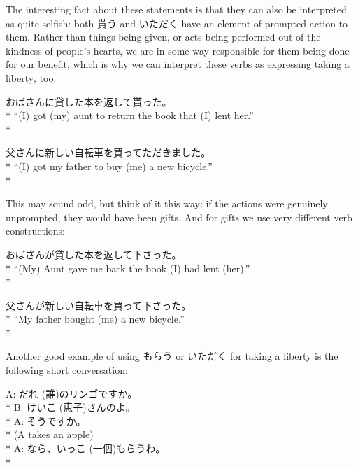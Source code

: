 \documentclass[11pt, b5paper, twoside, openright, onecolumn]{book}
\makeatletter
\newcommand*{\rubystack}[2]{{\relscale{0.5}%
  \begin{tabular}[b]{@{}c@{}}%
    {#1}\\%
   {\textscale{2}{#2}}%
  \end{tabular}}%
}
\DeclareRobustCommand*{\ruby}[2]{%
  \mbox{%
    \setlength{\parskip}{0ex}%
    \BeginAccSupp{method=pdfstringdef,ActualText={#1}}%
      \rubystack{\phantom{#2}}{#1}%
      \llap{%
        \rubystack{#2}{\phantom{#1}}%
      }%
    \EndAccSupp{}%
  }%
}
\renewcommand*{\ruby}[2]{#2 (#1)}%
\newenvironment{exampleblock}{
\setlength{\parindent}{0.6in}
\begin{minipage}[t]{\dimexpr\textwidth-\parindent}}
{\end{minipage}}
\makeatother
\begin{document}
The interesting fact about these statements is that they can also be interpreted as quite selfish: both 貰う and いただく have an element of prompted action to them. Rather than things being given‚ or acts being performed out of the kindness of people’s hearts‚ we are in some way responsible for them being done for our benefit‚ which is why we can interpret these verbs as expressing taking a liberty‚ too:

\vspace{0.4cm}
\begin{exampleblock}
おばさんに貸した本を返して貰った。 \\* 
“(I) got (my) aunt to return the book that (I) lent her.” \\* 
\end{exampleblock}
\vspace{0.2cm}

\begin{exampleblock}
父さんに新しい自転車を買ってただきました。 \\* 
“(I) got my father to buy (me) a new bicycle.” \\* 
\end{exampleblock}
\vspace{0.2cm}

This may sound odd‚ but think of it this way: if the actions were genuinely unprompted‚ they would have been gifts. And for gifts we use very different verb constructions:

\vspace{0.4cm}
\begin{exampleblock}
おばさんが貸した本を返して下さった。 \\* 
“(My) Aunt gave me back the book (I) had lent (her).” \\* 
\end{exampleblock}
\vspace{0.2cm}

\begin{exampleblock}
父さんが新しい自転車を買って下さった。 \\* 
“My father bought (me) a new bicycle.” \\* 
\end{exampleblock}
\vspace{0.2cm}

Another good example of using もらう or いただく for taking a liberty is the following short conversation:

\vspace{0.4cm}
\begin{exampleblock}
A: \ruby{誰}{だれ}のリンゴですか。 \\* 
B: \ruby{恵子}{けいこ}さんのよ。 \\* 
A: そうですか。 \\* 
(A takes an apple) \\* 
A: なら、\ruby{一個}{いっこ}もらうわ。 \\* 
\end{exampleblock}
\vspace{0.2cm}
\end{document}

